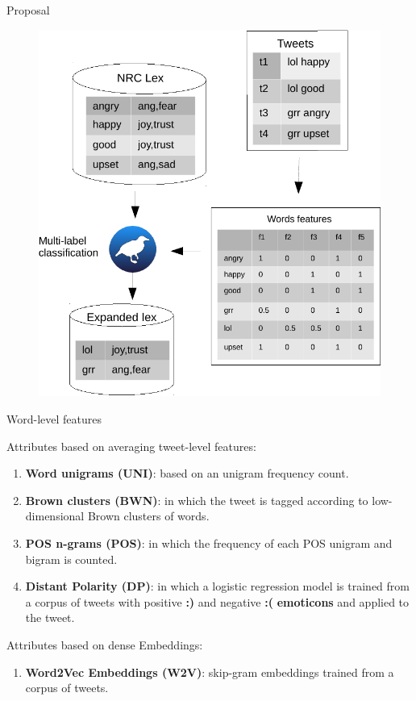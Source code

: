 \documentclass[handout]{beamer}
\begin{document}
\begin{frame}{Proposal}

  \begin{figure}[htb]
	\centering
	 \includegraphics[scale=0.5]{pics/emo_model.pdf}
\end{figure}

\end{frame}


\begin{frame}{Word-level features}


\begin{scriptsize}
Attributes based on averaging tweet-level features:
\begin{enumerate} 
\item \textbf{Word unigrams (UNI)}: based on an unigram frequency count.
\item \textbf{Brown clusters (BWN)}: in which the tweet is tagged according to low-dimensional Brown clusters of words. 
\item \textbf{POS n-grams (POS)}: in which the frequency of each POS unigram and bigram is counted.  
\item  \textbf{Distant Polarity (DP)}: in which a logistic regression model is trained from a corpus of tweets with positive \textbf{:)} and negative \textbf{:(} \textbf{emoticons} and applied to the tweet.
\end{enumerate}
Attributes based on dense Embeddings:
\begin{enumerate} 
\item  \textbf{Word2Vec Embeddings (W2V)}: skip-gram embeddings trained from a corpus of tweets.
\end{enumerate}
\end{scriptsize}
\end{frame}
\end{document}
